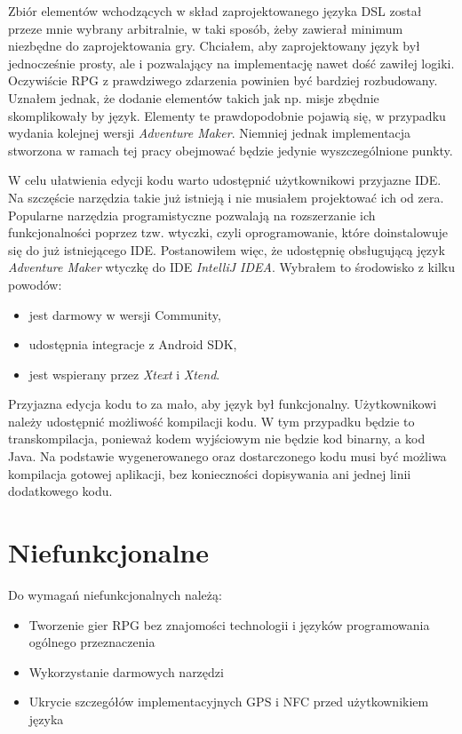 \documentclass[openright]{xmgr}
\begin{document}
Zbiór elementów wchodzących w skład zaprojektowanego języka DSL został przeze mnie wybrany arbitralnie, w taki sposób, żeby zawierał minimum niezbędne do zaprojektowania gry. Chciałem, aby zaprojektowany język był jednocześnie prosty, ale i pozwalający na implementację nawet dość zawiłej logiki. Oczywiście RPG z prawdziwego zdarzenia powinien być bardziej rozbudowany. Uznałem jednak, że dodanie elementów takich jak np. misje zbędnie skomplikowały by język. Elementy te prawdopodobnie pojawią się, w przypadku wydania kolejnej wersji \textit{Adventure Maker}. Niemniej jednak implementacja stworzona w ramach tej pracy obejmować będzie jedynie wyszczególnione punkty.

W celu ułatwienia edycji kodu warto udostępnić użytkownikowi przyjazne IDE. Na szczęście narzędzia takie już istnieją i nie musiałem projektować ich od zera. Popularne narzędzia programistyczne pozwalają na rozszerzanie ich funkcjonalności poprzez tzw. wtyczki, czyli oprogramowanie, które doinstalowuje się do już istniejącego IDE. Postanowiłem więc, że udostępnię obsługującą język \textit{Adventure Maker} wtyczkę do IDE \textit{IntelliJ IDEA}. Wybrałem to środowisko z kilku powodów:
\begin{itemize}	
\item jest darmowy w wersji Community,
\item udostępnia integracje z Android SDK,
\item jest wspierany przez \textit{Xtext} i \textit{Xtend}.
\end{itemize}

Przyjazna edycja kodu to za mało, aby język był funkcjonalny. Użytkownikowi należy udostępnić możliwość kompilacji kodu. W tym przypadku będzie to transkompilacja, ponieważ kodem wyjściowym nie będzie kod binarny, a kod Java. Na podstawie wygenerowanego oraz dostarczonego kodu musi być możliwa kompilacja gotowej aplikacji, bez konieczności dopisywania ani jednej linii dodatkowego kodu. 

\section{Niefunkcjonalne}
Do wymagań niefunkcjonalnych należą:
\begin{itemize}
	\item Tworzenie gier RPG bez znajomości technologii i języków programowania ogólnego przeznaczenia
	\item Wykorzystanie darmowych narzędzi
	\item Ukrycie szczegółów implementacyjnych GPS i NFC przed użytkownikiem języka
\end{itemize}
\end{document}
